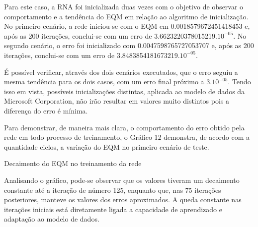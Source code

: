 Para este caso, a RNA foi inicializada duas vezes com o objetivo de observar o comportamento e a tendência do EQM em relação ao algoritmo de inicialização. No primeiro cenário, a rede iniciou-se com o EQM em 0.0018579672451418453 e, após as 200 iterações, conclui-se com um erro de 3.6623220378015219.$10^{-05}$. No segundo cenário, o erro foi inicializado com 0.0047598765727053707 e, após as 200 iterações, conclui-se com um erro de 3.8483854181673219.$10^{-05}$.

É possível verificar, através dos dois cenários executados, que o erro seguiu a mesma tendência para os dois casos, com um erro final próximo a 3.$10^{-05}$. Tendo isso em vista, possíveis inicializações distintas, aplicada ao modelo de dados da Microsoft Corporation, não irão resultar em valores muito distintos pois a diferença do erro é mínima.

Para demonstrar, de maneira mais clara, o comportamento do erro obtido pela rede em todo processo de treinamento, o Gráfico 12 demonstra, de acordo com a quantidade ciclos, a variação do EQM no primeiro cenário de teste.
\begin{grafico}[h]
	\centering
	\caption{Decaimento do EQM no treinamento da rede}
	\label{lingua}
\end{grafico}

Analisando o gráfico, pode-se observar que os valores tiveram um decaimento constante até a iteração de número 125, enquanto que, nas 75 iterações posteriores, manteve os valores dos erros aproximados. A queda constante nas iterações iniciais está diretamente ligada a capacidade de aprendizado e adaptação ao modelo de dados.


